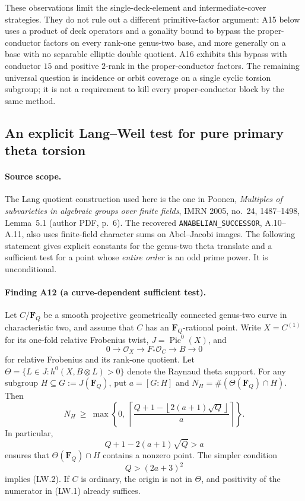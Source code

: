 \documentclass[11pt,a4paper]{article}
\begin{document}
These observations limit the single-deck-element and intermediate-cover
strategies. They do not rule out a different primitive-factor argument:
A15 below uses a product of deck operators and a gonality bound to bypass
the proper-conductor factors on every rank-one genus-two base, and more
generally on a base with no separable elliptic double quotient. A16
exhibits this bypass with conductor $15$ and positive $2$-rank in the
proper-conductor factors. The remaining universal question is incidence
or orbit coverage on a single cyclic torsion subgroup; it is not a
requirement to kill every proper-conductor block by the same method.


\subsection{An explicit Lang--Weil test for pure primary theta torsion}
\label{sec:lang-weil-theta}

\paragraph{Source scope.}
The Lang quotient construction used here is the one in Poonen,
\emph{Multiples of subvarieties in algebraic groups over finite fields},
IMRN 2005, no.~24, 1487--1498, Lemma~5.1 (author PDF, p.~6).
The recovered \texttt{ANABELIAN\_SUCCESSOR}, A.10--A.11, also uses
finite-field character sums on Abel--Jacobi images.  The following
statement gives explicit constants for the genus-two theta translate
and a sufficient test for a point whose \emph{entire order} is an odd
prime power.  It is unconditional.

\paragraph{Finding A12 (a curve-dependent sufficient test).}
Let $C/\mathbf F_Q$ be a smooth projective geometrically connected
genus-two curve in characteristic two, and assume that $C$ has an
$\mathbf F_Q$-rational point.  Write $X=C^{(1)}$ for its one-fold
relative Frobenius twist,
$J=\operatorname{Pic}^0(X)$, and
\[
 0\longrightarrow\mathcal O_X\longrightarrow F_*\mathcal O_C
 \longrightarrow B\longrightarrow0
\]
for relative Frobenius and its rank-one quotient.  Let
$\Theta=\{L\in J:h^0(X,B\otimes L)>0\}$ denote the Raynaud theta
support.  For any subgroup $H\subseteq G:=J(\mathbf F_Q)$, put
$a=[G:H]$ and
$N_H=\#(\Theta(\mathbf F_Q)\cap H)$.  Then
\[
 N_H\ \ge\
 \max\left\{0,\
 \left\lceil
 \frac{Q+1-\left\lfloor2(a+1)\sqrt Q\right\rfloor}{a}
 \right\rceil\right\}.
 \tag{LW.1}
\]
In particular,
\[
       Q+1-2(a+1)\sqrt Q>a
 \tag{LW.2}
\]
ensures that $\Theta(\mathbf F_Q)\cap H$ contains a nonzero point.
The simpler condition
\[
                       Q>(2a+3)^2
 \tag{LW.3}
\]
implies (LW.2).  If $C$ is ordinary, the origin is not in $\Theta$,
and positivity of the numerator in (LW.1) already suffices.
\end{document}
